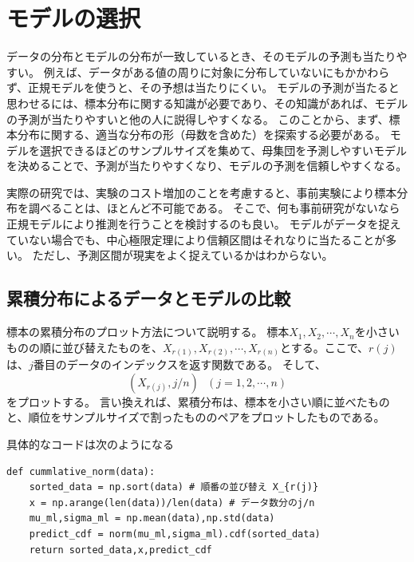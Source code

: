 \section{モデルの選択}
データの分布とモデルの分布が一致しているとき、そのモデルの予測も当たりやすい。
例えば、データがある値の周りに対象に分布していないにもかかわらず、正規モデルを使うと、その予想は当たりにくい。
モデルの予測が当たると思わせるには、標本分布に関する知識が必要であり、その知識があれば、モデルの予測が当たりやすいと他の人に説得しやすくなる。
このことから、まず、標本分布に関する、適当な分布の形（母数を含めた）を探索する必要がある。
モデルを選択できるほどのサンプルサイズを集めて、母集団を予測しやすいモデルを決めることで、予測が当たりやすくなり、モデルの予測を信頼しやすくなる。

実際の研究では、実験のコスト増加のことを考慮すると、事前実験により標本分布を調べることは、ほとんど不可能である。
そこで、何も事前研究がないなら正規モデルにより推測を行うことを検討するのも良い。
モデルがデータを捉えていない場合でも、中心極限定理により信頼区間はそれなりに当たることが多い。
ただし、予測区間が現実をよく捉えているかはわからない。




\subsection{累積分布によるデータとモデルの比較}

標本の累積分布のプロット方法について説明する。
標本$X_1,X_2,\cdots,X_n$を小さいものの順に並び替えたものを、$X_{r(1)},X_{r(2)},\cdots,X_{r(n)}$とする。ここで、$r(j)$は、$j$番目のデータのインデックスを返す関数である。
そして、
\begin{equation*}
    (X_{r(j)},j/n) \ \ \ (j=1,2,\cdots,n)
\end{equation*}
をプロットする。
言い換えれば、累積分布は、標本を小さい順に並べたものと、順位をサンプルサイズで割ったもののペアをプロットしたものである。

具体的なコードは次のようになる
\begin{lstlisting}
def cummlative_norm(data):
    sorted_data = np.sort(data) # 順番の並び替え X_{r(j)}
    x = np.arange(len(data))/len(data) # データ数分のj/n 
    mu_ml,sigma_ml = np.mean(data),np.std(data)
    predict_cdf = norm(mu_ml,sigma_ml).cdf(sorted_data)
    return sorted_data,x,predict_cdf
\end{lstlisting}

